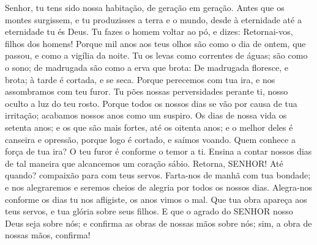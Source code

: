 {\PP 
  Senhor, tu tens sido nossa habitação, de geração em geração.
  Antes que os montes surgissem, e tu produzisses a terra e o mundo, desde à eternidade até a eternidade tu és Deus.
  Tu fazes o homem voltar ao pó, e dizes: Retornai-vos, filhos dos homens!
  Porque mil anos aos teus olhos são como o dia de ontem, que passou, e como a vigília da noite.
  Tu os levas como correntes de águas; são como o sono; de madrugada são como a erva que brota:
  De madrugada floresce, e brota; à tarde é cortada, e se seca.
  Porque perecemos com tua ira, e nos assombramos com teu furor.
  Tu pões nossas perversidades perante ti, nosso
{} oculto
{} a luz do teu rosto.
  Porque todos os nossos dias se vão por causa de tua irritação; acabamos nossos anos como um suspiro.
  Os dias de nossa vida
{} os setenta anos; e os que são mais fortes, até os oitenta anos; e o melhor deles é canseira e opressão, porque logo é cortado, e saímos voando.
  Quem conhece a força de tua ira? O teu furor é conforme o temor a ti.
  Ensina
{} a contar nossos dias de tal maneira que alcancemos um coração sábio.
  Retorna, SENHOR! Até quando?
{} compaixão para com teus servos.
  Farta-nos de manhã com tua bondade; e nos alegraremos e seremos cheios de alegria por todos os nossos dias.
  Alegra-nos conforme os dias
{} tu nos afligiste, os anos
{} vimos o mal.
  Que tua obra apareça aos teus servos, e tua glória sobre seus filhos.
  E que o agrado do SENHOR nosso Deus seja sobre nós; e confirma as obras de nossas mãos sobre nós; sim, a obra de nossas mãos, confirma!
\par }

